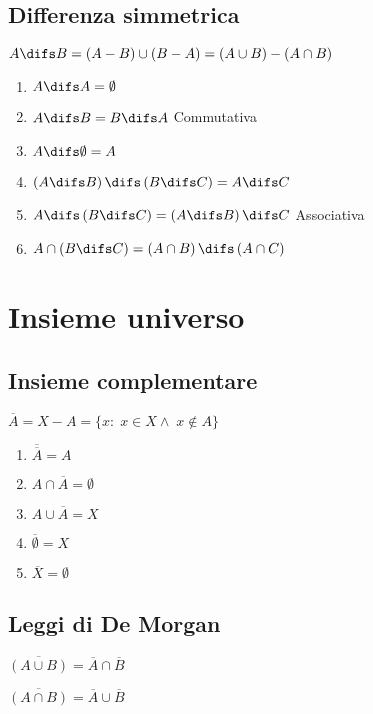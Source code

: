 \section{Differenza simmetrica}
$A\difs B=\left(A-B\right)\cup\left(B-A\right)=\left(A\cup B\right)-\left(A\cap B\right)$
\begin{center}
	
\end{center}
\begin{enumerate}
	\item $A\difs A=\emptyset$
	\item $A\difs B=B\difs A$ Commutativa
	\item $A\difs\emptyset=A$
	\item $\left(A\difs B\right)\difs\left(B\difs C\right)=A\difs C$
	\item $A\difs\left(B\difs C\right)=\left(A\difs B\right)\difs C$ Associativa
	\item $A\cap\left(B\difs C\right)=\left(A\cap B\right)\difs\left(A\cap C\right)$
\end{enumerate}
\chapter{Insieme universo}
\section{Insieme complementare}
\begin{center}
	
\end{center}
$\overline{A}=X-A=\lbrace x:\; x\in X\wedge\; x\notin A\rbrace$
\begin{enumerate}
	\item $\overline{\overline{A}}=A$
	\item $A\cap\overline{A}=\emptyset$
	\item $A\cup\overline{A}=X$
	\item $\overline{\emptyset}=X$
	\item $\overline{X}=\emptyset$
\end{enumerate}
\section{Leggi di De Morgan}
$\overline{\left(A\cup B\right)}=\overline{A}\cap\overline{B}$

$\overline{\left(A\cap B\right)}=\overline{A}\cup\overline{B}$